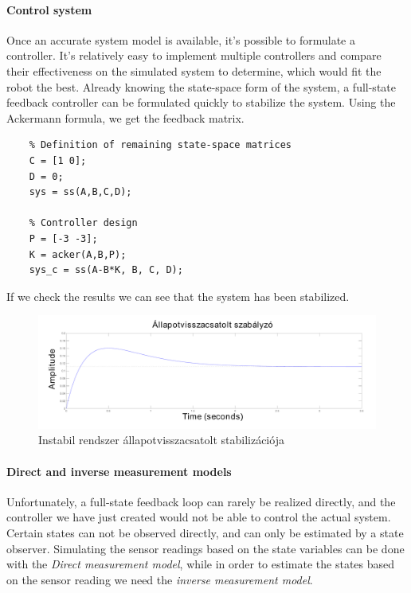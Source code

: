 \paragraph{Control system}

Once an accurate system model is available, it's possible to formulate a controller. It's relatively easy to implement multiple controllers and compare their effectiveness on the simulated system to determine, which would fit the robot the best.
Already knowing the state-space form of the system, a full-state feedback controller can be formulated quickly to stabilize the system. Using the Ackermann formula, we get the feedback matrix.

\begin{lstlisting}
    % Definition of remaining state-space matrices
    C = [1 0];
    D = 0;
    sys = ss(A,B,C,D);
    
    % Controller design
    P = [-3 -3];
    K = acker(A,B,P);
    sys_c = ss(A-B*K, B, C, D);
\end{lstlisting}

If we check the results we can see that the system has been stabilized.

\begin{figure}[!ht]
    \centering
    \includegraphics[width=\linewidth]{img/plot2}
    \caption{Instabil rendszer állapotvisszacsatolt stabilizációja}
    \label{fig:plot2}
\end{figure}

\paragraph{Direct and inverse measurement models}

Unfortunately, a full-state feedback loop can rarely be realized directly, and the controller we have just created would not be able to control the actual system. Certain states can not be observed directly, and can only be estimated by a state observer. Simulating the sensor readings based on the state variables can be done with the \emph{Direct measurement model}, while in order to estimate the states based on the sensor reading we need the \emph{inverse measurement model}.

